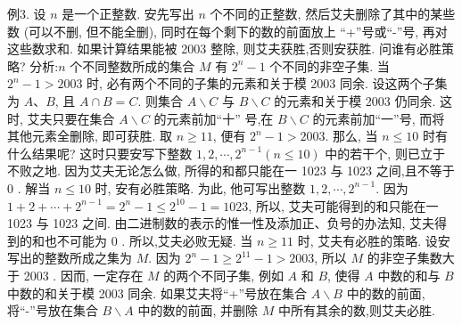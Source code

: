 例3. 设 $n$ 是一个正整数.
安先写出 $n$ 个不同的正整数, 然后艾夫删除了其中的某些数 (可以不删, 但不能全删), 同时在每个剩下的数的前面放上 “+”号或“-”号, 再对这些数求和.
如果计算结果能被 2003 整除, 则艾夫获胜,否则安获胜.
问谁有必胜策略?
分析:$n$ 个不同整数所成的集合 $M$ 有 $2^n-1$ 个不同的非空子集.
当 $2^n- 1>2003$ 时, 必有两个不同的子集的元素和关于模 2003 同余.
设这两个子集为 $A 、 B$, 且 $A \cap B=C$. 则集合 $A \backslash C$ 与 $B \backslash C$ 的元素和关于模 2003 仍同余.
这时, 艾夫只要在集合 $A \backslash C$ 的元素前加“十” 号,在 $B \backslash C$ 的元素前加“一”号, 而将其他元素全删除, 即可获胜.
取 $n \geqslant 11$, 便有 $2^n-1>2003$.
那么, 当 $n \leqslant 10$ 时有什么结果呢? 这时只要安写下整数 $1,2, \cdots, 2^{n-1} (n \leqslant 10)$ 中的若干个, 则已立于不败之地.
因为艾夫无论怎么做, 所得的和都只能在一 1023 与 1023 之间,且不等于 0 .
解当 $n \leqslant 10$ 时, 安有必胜策略.
为此, 他可写出整数 $1,2, \cdots, 2^{n-1}$. 因为 $1+2+\cdots+2^{n-1}=2^n-1 \leqslant 2^{10}-1=1023$, 所以, 艾夫可能得到的和只能在一 1023 与 1023 之间.
由二进制数的表示的惟一性及添加正、负号的办法知, 艾夫得到的和也不可能为 0 . 所以,艾夫必败无疑.
当 $n \geqslant 11$ 时, 艾夫有必胜的策略.
设安写出的整数所成之集为 $M$. 因为 $2^n-1 \geqslant 2^{11}-1>2003$, 所以 $M$ 的非空子集数大于 2003 . 因而, 一定存在 $M$ 的两个不同子集, 例如 $A$ 和 $B$, 使得 $A$ 中数的和与 $B$ 中数的和关于模 2003 同余.
如果艾夫将“+”号放在集合 $A \backslash B$ 中的数的前面, 将“-”号放在集合 $B \backslash A$ 中的数的前面, 并删除 $M$ 中所有其余的数,则艾夫必胜.



